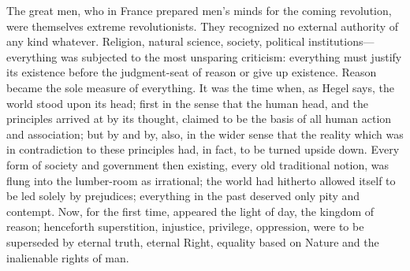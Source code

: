 The great men, who in France prepared men's minds for the coming revolution,
were themselves extreme revolutionists. They recognized no external authority of
any kind whatever. Religion, natural science, society, political
institutions---everything was subjected to the most unsparing criticism:
everything must justify its existence before the judgment-seat of reason or
give up existence. Reason became the sole measure of everything. It was the time
when, as Hegel says, the world stood upon its head; first in the sense that the human head, and the principles arrived at by its
thought, claimed to be the basis of all human action and association; but by
and by, also, in the wider sense that the reality which was in contradiction to
these principles had, in fact, to be turned upside down. Every form of society
and government then existing, every old traditional notion, was flung into the
lumber-room as irrational; the world had hitherto allowed itself to be led
solely by prejudices; everything in the past deserved only pity and contempt.
Now, for the first time, appeared the light of day, the kingdom of reason;
henceforth superstition, injustice, privilege, oppression, were to be superseded
by eternal truth, eternal Right, equality based on Nature and the inalienable
rights of man.

